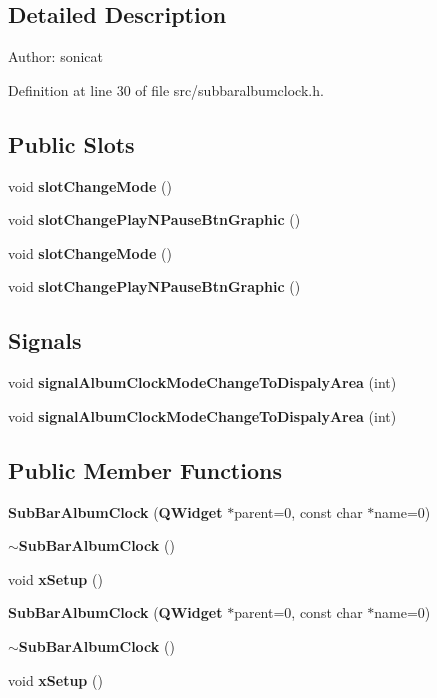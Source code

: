 \subsection{Detailed Description}
\begin{Desc}
\item[Author:]sonicat \end{Desc}




Definition at line 30 of file src/subbaralbumclock.h.\subsection*{Public Slots}
\begin{CompactItemize}
\item 
void {\bf slot\-Change\-Mode} ()
\item 
void {\bf slot\-Change\-Play\-NPause\-Btn\-Graphic} ()
\item 
void {\bf slot\-Change\-Mode} ()
\item 
void {\bf slot\-Change\-Play\-NPause\-Btn\-Graphic} ()
\end{CompactItemize}
\subsection*{Signals}
\begin{CompactItemize}
\item 
void {\bf signal\-Album\-Clock\-Mode\-Change\-To\-Dispaly\-Area} (int)
\item 
void {\bf signal\-Album\-Clock\-Mode\-Change\-To\-Dispaly\-Area} (int)
\end{CompactItemize}
\subsection*{Public Member Functions}
\begin{CompactItemize}
\item 
{\bf Sub\-Bar\-Album\-Clock} ({\bf QWidget} $\ast$parent=0, const char $\ast$name=0)
\item 
{\bf $\sim$Sub\-Bar\-Album\-Clock} ()
\item 
void {\bf x\-Setup} ()
\item 
{\bf Sub\-Bar\-Album\-Clock} ({\bf QWidget} $\ast$parent=0, const char $\ast$name=0)
\item 
{\bf $\sim$Sub\-Bar\-Album\-Clock} ()
\item 
void {\bf x\-Setup} ()
\end{CompactItemize}

